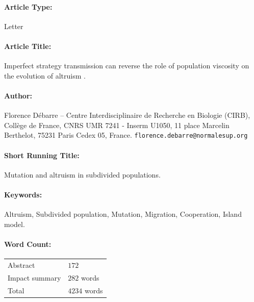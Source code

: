 \documentclass[11pt, letterpaper]{article}
\begin{document}
\pagestyle{maintext}


\paragraph{Article Type:} Letter

\paragraph{Article Title:} Imperfect strategy transmission can reverse the role of population viscosity on the evolution of altruism .

\paragraph{Author:} Florence D\'ebarre -- Centre Interdisciplinaire de Recherche en Biologie (CIRB), Coll\`ege de France, CNRS UMR 7241 - Inserm U1050, 11 place Marcelin Berthelot, 75231 Paris Cedex 05, France. \texttt{florence.debarre@normalesup.org}

\paragraph{Short Running Title:} Mutation and altruism in subdivided populations.

\paragraph{Keywords:} Altruism, Subdivided population, Mutation, Migration, Cooperation, Island model.

\paragraph{Word Count:}
\begin{tabular}[t]{ll}
Abstract & $172$ \\
Impact summary & $282$ words \\
Total & $4234$ words
\end{tabular}


\end{document}
